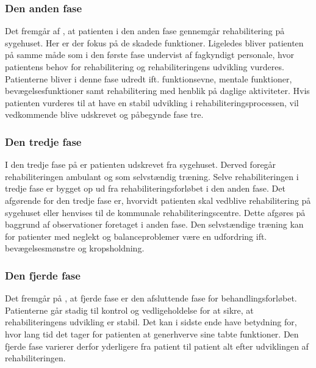 \subsubsection{Den anden fase}
Det fremgår af , at patienten i den anden fase gennemgår rehabilitering på sygehuset. Her er der fokus på de skadede funktioner. Ligeledes bliver patienten på samme måde som i den første fase undervist af fagkyndigt personale, hvor patientens behov for rehabilitering og rehabiliteringens udvikling vurderes. Patienterne bliver i denne fase udredt ift. funktionsevne, mentale funktioner, bevægelsesfunktioner samt rehabilitering med henblik på daglige aktiviteter. Hvis patienten vurderes til at have en stabil udvikling i rehabiliteringsprocessen, vil vedkommende blive udskrevet og påbegynde fase tre. \cite{Sundhedsstyrelsen2011a}

\subsubsection{Den tredje fase}
I den tredje fase på  er patienten udskrevet fra sygehuset. Derved foregår rehabiliteringen ambulant og som selvstændig træning. Selve rehabiliteringen i tredje fase er bygget op ud fra rehabiliteringsforløbet i den anden fase. Det afgørende for den tredje fase er, hvorvidt patienten skal vedblive rehabilitering på sygehuset eller henvises til de kommunale rehabiliteringscentre. Dette afgøres på baggrund af observationer foretaget i anden fase. Den selvstændige træning kan for patienter med neglekt og balanceproblemer være en udfordring ift. bevægelsesmønstre og kropsholdning. \cite{Sundhedsstyrelsen2011a}

\subsubsection{Den fjerde fase}
Det fremgår på , at fjerde fase er den afsluttende fase for behandlingsforløbet. Patienterne går stadig til kontrol og vedligeholdelse for at sikre, at rehabiliteringens udvikling er stabil. Det kan i sidste ende have betydning for, hvor lang tid det tager for patienten at generhverve sine tabte funktioner. Den fjerde fase varierer derfor yderligere fra patient til patient alt efter udviklingen af rehabiliteringen. \cite{Sundhedsstyrelsen2011a} \\

